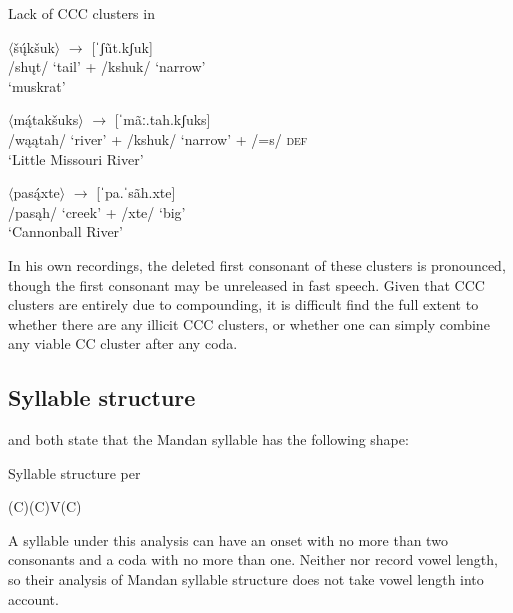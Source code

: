 \begin{exe}
\item\label{CCCclusters} Lack of CCC clusters in \citet{hollow1970}

	\begin{xlist}


	\item $\langle$šų́kšuk$\rangle$ $\to$	{[}ˈʃũt.kʃuk]\\
	{/}shųt/ `tail' + /kshuk/ `narrow'\\
	`muskrat'

	\item $\langle$mą́takšuks$\rangle$ $\to$ 	{[}ˈmãː.tah.kʃuks]\\
	{/}wąątah/ `river' + /kshuk/ `narrow' + /=s/ \textsc{def}\\
	`Little Missouri River'

	\item $\langle$pasą́xte$\rangle$ $\to$ 	{[}ˈpa.ˈsãh.xte]\\
	{/}pasąh/ `creek' + /xte/ `big'\\
	`Cannonball River'

	\end{xlist}


\end{exe}

In his own recordings, the deleted first consonant of these clusters is pronounced, though the first consonant may be unreleased in fast speech.  Given that CCC clusters are entirely due to compounding, it is difficult find the full extent to whether there are any illicit CCC clusters, or whether one can simply combine any viable CC cluster after any coda.

\subsection{Syllable structure}\label{syllablestructure}

\citet[15]{hollow1970} and \citet[21]{coberly1979} both state that the Mandan syllable has the following shape:

\begin{exe}
\item\label{mandansyllable1} Syllable structure per \citet[15]{hollow1970}

(C)(C)V(C)
\end{exe}

A syllable under this analysis can have an onset with no more than two consonants and a coda with no more than one. Neither \citeauthor{hollow1970} nor \citeauthor{coberly1979} record vowel length, so their analysis of Mandan syllable structure does not take vowel length into account.

